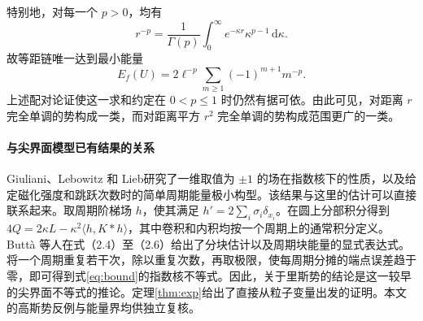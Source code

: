 \documentclass[11pt]{article}
\theoremstyle{definition}
\newcommand{\dd}{\,\mathrm d}
\begin{document}
特别地，对每一个 $p>0$，均有
\[
r^{-p}=\frac{1}{\Gamma(p)}\int_0^\infty e^{-\kappa r}\kappa^{p-1}\dd\kappa.
\]
故等距链唯一达到最小能量
\[
E_f(U)=2\ell^{-p}\sum_{m\ge1}(-1)^{m+1}m^{-p}.
\]
上述配对论证使这一求和约定在 $0<p\le1$ 时仍然有据可依。由此可见，对距离 $r$ 完全单调的势构成一类，而对距离平方 $r^2$ 完全单调的势构成范围更广的一类。

\newpage
\paragraph{与尖界面模型已有结果的关系}
Giuliani、Lebowitz 和 Lieb\cite{GLL}研究了一维取值为 $\pm1$ 的场在指数核下的性质，以及给定磁化强度和跳跃次数时的简单周期能量极小构型。该结果与这里的估计可以直接联系起来。取周期阶梯场 $h$，使其满足 $h'=2\sum_i\sigma_i\delta_{x_i}$。在圆上分部积分得到 $4Q=2\kappa L-\kappa^2\langle h,K*h\rangle$，其中卷积和内积均按一个周期上的通常积分定义。Buttà 等人\cite{BEGM}在式（2.4）至（2.6）给出了分块估计以及周期块能量的显式表达式。将一个周期重复若干次，除以重复次数，再取极限，使每周期分摊的端点误差趋于零，即可得到式\eqref{eq:bound}的指数核不等式。因此，关于里斯势的结论是这一较早的尖界面不等式的推论。定理\ref{thm:exp}给出了直接从粒子变量出发的证明。本文的高斯势反例与能量界均供独立复核。
\end{document}
